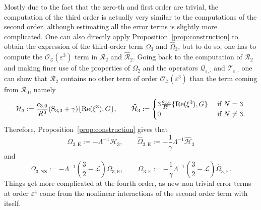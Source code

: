 \documentclass[11pt,reqno,a4paper]{amsart}
\def\eps{\varepsilon}
\def\Re{{\rm Re}}
\newcommand{\cH}{\mathcal{H}}
\newcommand{\cL}{\mathcal{L}}
\newcommand{\cO}{\mathcal{O}}
\newcommand{\cQ}{\mathcal{Q}}
\newcommand{\cR}{\mathcal{R}}
\newcommand{\cT}{\mathcal{T}}
\newcommand{\cZ}{\mathcal{Z}}
\newcommand{\1}{\mathbbm{1}}
\theoremstyle{definition}
\theoremstyle{definition}
\numberwithin{equation}{section}
\begin{document}
Mostly due to the fact that the zero-th and first order are trivial, the computation of the third order is actually very similar to the computations of the second order, although estimating all the error terms is slightly more complicated. One can also directly apply Proposition~\ref{prop:construction} to obtain the expression of the third-order term $\Omega_3$ and $\widehat{\Omega}_3$, but to do so, one has to compute the $\cO_\cZ(\eps^3)$ term in $\cR_2$ and $\widehat{\cR}_2$. Going back to the computation of $\cR_2$ and making finer use of the properties of $\Omega_2$ and the operators $\cQ_{\eps,\cdot}$ and $\cT_{\eps,\cdot}$ one can show that $\cR_2$ contains no other term of order $\cO_\cZ(\eps^3)$ than the term coming from $\cR_0$, namely
    \begin{equation}
        \cH_3 := \frac{c_{3,0}}{R^3} ({\rm S}_{3,3} + \gamma) \{ \Re(\xi^3), G\} , \qquad 
    \widehat{\cH}_3 := \begin{cases}
        3\frac{c_{3,0}}{R^3}  \{ \Re(\xi^3), G\} & \text{ if } N = 3 \\
         0 & \text{ if } N \neq 3.
    \end{cases}
    \end{equation}
Therefore, Proposition~\ref{prop:construction} gives that 
\begin{equation}
    \Omega_{3,\mathrm{E}} := -\Lambda^{-1} \cH_3, \qquad \widehat{\Omega}_{3,\mathrm{E}} := -\frac{1}{\gamma}\Lambda^{-1} \widehat{\cH}_3
\end{equation}
and
\begin{equation}
    \Omega_{3,\mathrm{NS}} := -\Lambda^{-1} \left(\frac{3}{2}-\cL\right)\Omega_{3,\mathrm{E}}, \qquad \widehat{\Omega}_{3,\mathrm{E}} :=  -\frac{1}{\gamma}\Lambda^{-1} \left(\frac{3}{2}-\cL\right)\widehat{\Omega}_{3,\mathrm{E}}.
\end{equation}
Things get more complicated at the fourth order, as new non trivial error terms at order $\eps^4$ come from the nonlinear interactions of the second order term with itself.
\end{document}
